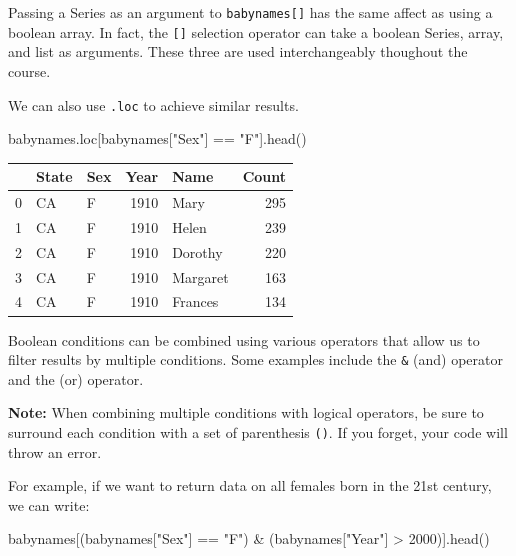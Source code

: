 \documentclass[
  letterpaper,
  DIV=11,
  numbers=noendperiod]{scrreprt}
\newenvironment{Shaded}{\begin{snugshade}}{\end{snugshade}}
\newcommand{\DecValTok}[1]{\textcolor[rgb]{0.68,0.00,0.00}{#1}}
\newcommand{\NormalTok}[1]{\textcolor[rgb]{0.00,0.23,0.31}{#1}}
\newcommand{\OperatorTok}[1]{\textcolor[rgb]{0.37,0.37,0.37}{#1}}
\newcommand{\StringTok}[1]{\textcolor[rgb]{0.13,0.47,0.30}{#1}}
\begin{document}
Passing a Series as an argument to \texttt{babynames{[}{]}} has the same
affect as using a boolean array. In fact, the \texttt{{[}{]}} selection
operator can take a boolean Series, array, and list as arguments. These
three are used interchangeably thoughout the course.

We can also use \texttt{.loc} to achieve similar results.

\begin{Shaded}
\begin{Highlighting}[]
\NormalTok{babynames.loc[babynames[}\StringTok{"Sex"}\NormalTok{] }\OperatorTok{==} \StringTok{"F"}\NormalTok{].head()}
\end{Highlighting}
\end{Shaded}

\begin{tabular}{lllrlr}
\toprule
{} & State & Sex &  Year &      Name &  Count \\
\midrule
0 &    CA &   F &  1910 &      Mary &    295 \\
1 &    CA &   F &  1910 &     Helen &    239 \\
2 &    CA &   F &  1910 &   Dorothy &    220 \\
3 &    CA &   F &  1910 &  Margaret &    163 \\
4 &    CA &   F &  1910 &   Frances &    134 \\
\bottomrule
\end{tabular}

Boolean conditions can be combined using various operators that allow us
to filter results by multiple conditions. Some examples include the
\texttt{\&} (and) operator and the \texttt{\textbar{}} (or) operator.

\textbf{Note:} When combining multiple conditions with logical
operators, be sure to surround each condition with a set of parenthesis
\texttt{()}. If you forget, your code will throw an error.

For example, if we want to return data on all females born in the 21st
century, we can write:

\begin{Shaded}
\begin{Highlighting}[]
\NormalTok{babynames[(babynames[}\StringTok{"Sex"}\NormalTok{] }\OperatorTok{==} \StringTok{"F"}\NormalTok{) }\OperatorTok{\&}\NormalTok{ (babynames[}\StringTok{"Year"}\NormalTok{] }\OperatorTok{\textgreater{}} \DecValTok{2000}\NormalTok{)].head()}
\end{Highlighting}
\end{Shaded}
\end{document}
